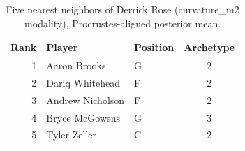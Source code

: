 \begin{table}[htbp]
  \centering\small
  \begin{tabular}{rllc}
    \toprule
    Rank & Player & Position & Archetype \\
    \midrule
    1 & Aaron Brooks & G & 2 \\
    2 & Dariq Whitehead & F & 2 \\
    3 & Andrew Nicholson & F & 2 \\
    4 & Bryce McGowens & G & 3 \\
    5 & Tyler Zeller & C & 2 \\
    \bottomrule
  \end{tabular}
  \caption{Five nearest neighbors of Derrick Rose (curvature_m2 modality), Procrustes-aligned posterior mean.}
  \label{tab:Derrick_Rose_neighbors_curvature_m2}
\end{table}


